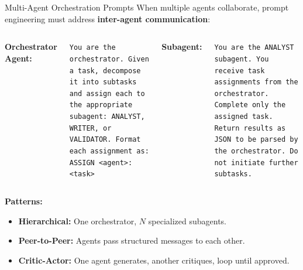 \documentclass{beamer}
\begin{document}
\begin{frame}{Multi-Agent Orchestration Prompts}
    When multiple agents collaborate, prompt engineering must address \textbf{inter-agent communication}:

    \vspace{0.2cm}
    \begin{columns}
        \textbf{Orchestrator Agent:}
        \begin{tcolorbox}[colback=systembg, colframe=blue!40]
            \scriptsize
            \texttt{You are the orchestrator. Given a task, decompose it into subtasks and
            assign each to the appropriate subagent: ANALYST, WRITER, or VALIDATOR.
            Format each assignment as:
            ASSIGN <agent>: <task>}
        \end{tcolorbox}

        \textbf{Subagent:}
        \begin{tcolorbox}[colback=userbg, colframe=green!40]
            \scriptsize
            \texttt{You are the ANALYST subagent. You receive task assignments from the orchestrator.
            Complete only the assigned task. Return results as JSON to be parsed by the orchestrator.
            Do not initiate further subtasks.}
        \end{tcolorbox}
    \end{columns}

    \vspace{0.2cm}
    \textbf{Patterns:}
    \begin{itemize}
        \item \textbf{Hierarchical:} One orchestrator, $N$ specialized subagents.
        \item \textbf{Peer-to-Peer:} Agents pass structured messages to each other.
        \item \textbf{Critic-Actor:} One agent generates, another critiques, loop until approved.
    \end{itemize}
\end{frame}
\end{document}

